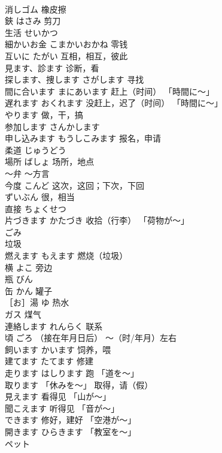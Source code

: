 \documentclass[8pt]{extreport}
\begin{document}
\begin{CJK}{UTF8}{min}
\\	消しゴム	橡皮擦	
\\	鋏	はさみ 剪刀	
\\	生活	せいかつ	
\\	細かいお金	こまかいおかね 零钱	
\\	互いに	たがい 互相，相互，彼此	
\\	見ます、診ます	诊断，看	
\\	探します、捜します	さがします 寻找	
\\	間に合います	まにあいます 赶上（时间） 「時間に〜」	
\\	遅れます	おくれます 没赶上，迟了（时间） 「時間に〜」	
\\	やります	做，干，搞	
\\	参加します	さんかします	
\\	申し込みます	もうしこみます 报名，申请	
\\	柔道	じゅうどう	
\\	場所	ばしょ 场所，地点	
\\	～弁	〜方言	
\\	今度	こんど 这次，这回；下次，下回	
\\	ずいぶん	很，相当	
\\	直接	ちょくせつ	
\\	片づきます	かたづき 收拾（行李） 「荷物が〜」	
\\	ごみ	
\\	垃圾	
\\	燃えます	もえます 燃烧（垃圾）	
\\	横	よこ 旁边	
\\	瓶	びん	
\\	缶	かん 罐子	
\\	［お］湯	ゆ 热水	
\\	ガス	煤气	
\\	連絡します	れんらく 联系	
\\	頃	ごろ （接在年月日后） ～（时/年月）左右 
\\	飼います	かいます 饲养，喂	
\\	建てます	たてます 修建	
\\	走ります	はしります 跑 「道を〜」	
\\	取ります 「休みを〜」	取得，请（假）	
\\	見えます	看得见 「山が〜」	
\\	聞こえます	听得见 「音が〜」	
\\	できます	修好，建好 「空港が〜」	
\\	開きます	ひらきます 「教室を〜」	
\\	ペット	

\end{CJK}
\end{document}
